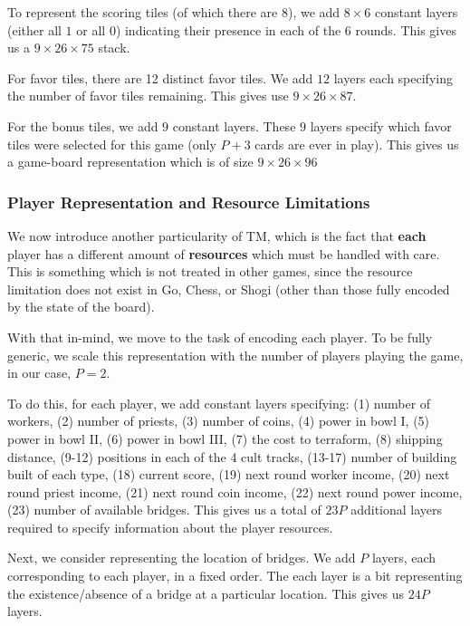 \documentclass[12pt,twocolumn,letterpaper]{article}
\begin{document}
To represent the scoring tiles (of which there are 8), we add $8\times6$ constant layers (either all $1$ or all $0$) indicating their presence in each of the $6$ rounds. This gives us a $9 \times 26 \times 75$ stack.

For favor tiles, there are 12 distinct favor tiles. We add $12$ layers each specifying the number of favor tiles remaining. This gives use $9 \times 26 \times 87$.

For the bonus tiles, we add $9$ constant layers. These $9$ layers specify which favor tiles were selected for this game (only $P + 3$ cards are ever in play). This gives us a game-board representation which is of size $9 \times 26 \times 96$

\subsubsection{Player Representation and Resource Limitations}
\label{subsubsection:player_representation_and_resource_limitations}
We now introduce another particularity of TM, which is the fact that \textbf{each} player has a different amount of \textbf{resources} which must be handled with care. This is something which is not treated in other games, since the resource limitation does not exist in Go, Chess, or Shogi (other than those fully encoded by the state of the board).

With that in-mind, we move to the task of encoding each player. To be fully generic, we scale this representation with the number of players playing the game, in our case, $P = 2$.

To do this, for each player, we add constant layers specifying: (1) number of workers, (2) number of priests,  (3) number of coins, (4) power in bowl I, (5) power in bowl II, (6) power in bowl III, (7) the cost to terraform, (8) shipping distance, (9-12) positions in each of the 4 cult tracks, (13-17) number of building built of each type, (18) current score, (19) next round worker income, (20) next round priest income, (21) next round coin income, (22) next round power income, (23) number of available bridges. This gives us a total of $23P$ additional layers required to specify information about the player resources.

Next, we consider representing the location of bridges. We add $P$ layers, each corresponding to each player, in a fixed order. The each layer is a bit representing the existence/absence of a bridge at a particular location. This gives us $24P$ layers.
\end{document}
